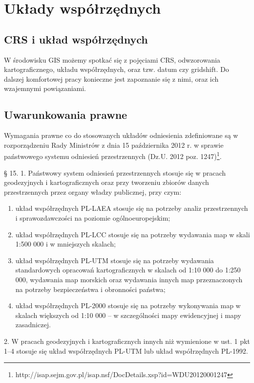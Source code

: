 \documentclass[a4paper,11pt, onecolumn, openany]{memoir}
\begin{document}
	\chapter{Układy współrzędnych}
		\section{CRS i układ współrzędnych}
		W środowisku GIS możemy spotkać się z pojęciami CRS, odwzorowania kartograficznego, układu współrzędnych, oraz tzw. datum czy gridshift. Do dalszej komfortowej pracy konieczne jest zapoznanie się z nimi, oraz ich wzajemnymi powiązaniami.
	
		\section{Uwarunkowania prawne}
		Wymagania prawne co do stosowanych układów odniesienia zdefiniowane są w rozporządzeniu Rady Ministrów z dnia 15 października 2012 r. w sprawie państwowego systemu odniesień przestrzennych (Dz.U. 2012 poz. 1247)\footnote{http://isap.sejm.gov.pl/isap.nsf/DocDetails.xsp?id=WDU20120001247}.
\begin{tcolorbox}[colback=black!5!white,colframe=white!55!black,title=§ 15. 1 i 2 rozporządzenia]
	§ 15. 1. Państwowy system odniesień przestrzennych stosuje się w pracach geodezyjnych i kartograficznych oraz przy
tworzeniu zbiorów danych przestrzennych przez organy władzy publicznej, przy czym:
\begin{enumerate}
	\item układ współrzędnych PL-LAEA stosuje się na potrzeby analiz przestrzennych i sprawozdawczości na poziomie ogólnoeuropejskim;
	\item układ współrzędnych PL-LCC stosuje się na potrzeby wydawania map w skali 1:500 000 i w mniejszych skalach;
	\item układ współrzędnych PL-UTM stosuje się na potrzeby wydawania standardowych opracowań kartograficznych w skalach od 1:10 000 do 1:250 000, wydawania map morskich oraz wydawania innych map przeznaczonych na potrzeby
	bezpieczeństwa i obronności państwa;
	\item układ współrzędnych PL-2000 stosuje się na potrzeby wykonywania map w skalach większych od 1:10 000 – w szczególności mapy ewidencyjnej i mapy zasadniczej.
\end{enumerate}
2. W pracach geodezyjnych i kartograficznych innych niż wymienione w ust. 1 pkt 1–4 stosuje się układ współrzędnych
PL-UTM lub układ współrzędnych PL-1992.
\end{tcolorbox}	
\end{document}
